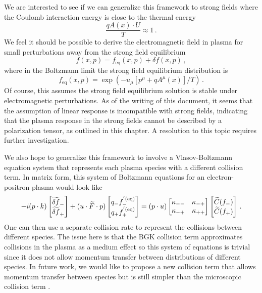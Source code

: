We are interested to see if we can generalize this framework to strong fields where the Coulomb interaction energy is close to the thermal energy
\begin{equation}
    \frac{ qA(x)\cdot U}{T}\approx 1\,.
\end{equation}
We feel it should be possible to derive the electromagnetic field in plasma for small perturbations away from the strong field equilibrium 
\begin{equation}
    f(x,p) = f_\text{eq}(x,p) + \delta f (x,p)\,,
\end{equation}
where in the Boltzmann limit the strong field equilibrium distribution is \cite{Hakim:2011bk,Hakim:1967prd}
\begin{equation}
     f_\text{eq}(x,p) = \exp \left(-u_{\mu}[p^{\mu}+q A^{\mu}(x)]/T\right)\,.
\end{equation}
Of course, this assumes the strong field equilibrium solution is stable under electromagnetic perturbations. As of the writing of this document, it seems that the assumption of linear response is incompatible with strong fields, indicating that the plasma response in the strong fields cannot be described by a polarization tensor, as outlined in this chapter. A resolution to this topic requires further investigation.


We also hope to generalize this framework to involve a Vlasov-Boltzmann equation  system that represents each plasma species with a different collision term. In matrix form, this system of Boltzmann equations for an electron-positron plasma would look like
\begin{equation}\label{eq:vectoreq}
-i (p \cdot k) \left[\begin{matrix}
\widetilde{\delta f}_- \\ \widetilde{\delta f}_+ 
\end{matrix}\right] + (u \cdot \widetilde{F} \cdot p)\left[\begin{matrix}
q_-f^{'(\mathrm{eq})}_- \\ q_+f^{'(\mathrm{eq})}_+
\end{matrix}\right] = (p \cdot u) \left[\begin{matrix}
\kappa_{--} & \kappa_{-+}\\
\kappa_{-+} & \kappa_{++}
\end{matrix}\right]\left[\begin{matrix}
\widetilde{C}(f_-) \\ \widetilde{C}(f_+)
\end{matrix} \right]\,.
\end{equation}
One can then use a separate collision rate to represent the collisions between different species. The issue here is that the BGK collision term approximates collisions in the plasma as a medium effect so this system of equations is trivial since it does not allow momentum transfer between distributions of different species. In future work, we would like to propose a new collision term that allows momentum transfer between species but is still simpler than the microscopic collision term .
